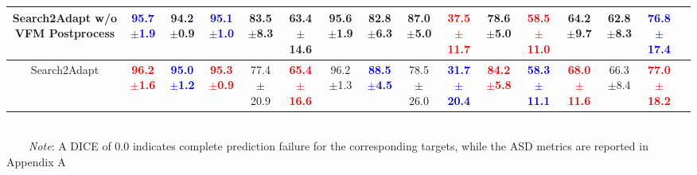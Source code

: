 \begin{table}[htbp]
{\begin{tabular}{@{}cccccccccccccccc@{}}
{Search2Adapt w/o VFM Postprocess}
  & {\textcolor{blue}{\textbf{95.7$\pm$1.9}}}
  & {94.2$\pm$0.9}
  & {\textcolor{blue}{\textbf{95.1$\pm$1.0}}}
  & {83.5$\pm$8.3}
  & {63.4$\pm$14.6}
  & {95.6$\pm$1.9}
  & {82.8$\pm$6.3}
  & {87.0$\pm$5.0}
  & {\textcolor{red}{\textbf{37.5$\pm$11.7}}}
  & {78.6$\pm$5.0}
  & {\textcolor{red}{\textbf{58.5$\pm$11.0}}}
  & {64.2$\pm$9.7}
  & {62.8$\pm$8.3}
  & {\textcolor{blue}{\textbf{76.8$\pm$17.4}}}\\  \hline
{Search2Adapt}
  & {\textcolor{red}{\textbf{96.2$\pm$1.6}}}
  & {\textcolor{blue}{\textbf{95.0$\pm$1.2}}}
  & {\textcolor{red}{\textbf{95.3$\pm$0.9}}}
  & {77.4$\pm$20.9}
  & {\textcolor{red}{\textbf{65.4$\pm$16.6}}}
  & {96.2$\pm$1.3}
  & {\textcolor{blue}{\textbf{88.5$\pm$4.5}}}
  & {78.5$\pm$26.0}
  & \textcolor{blue}{\textbf{31.7$\pm$20.4}}
  & {\textcolor{red}{\textbf{84.2$\pm$5.8}}}
  & {\textcolor{blue}{\textbf{58.3$\pm$11.1}}}
  & {\textcolor{red}{\textbf{68.0$\pm$11.6}}}
  & {66.3$\pm$8.4}
  & {\textcolor{red}{\textbf{77.0$\pm$18.2}}}\\
\bottomrule
\end{tabular}
}
\\[2pt]
\footnotesize{~~~~\textit{Note}: A DICE of 0.0 indicates complete prediction failure for the corresponding targets, while the ASD metrics are reported in Appendix A}
\vspace{-5mm}
\end{table}